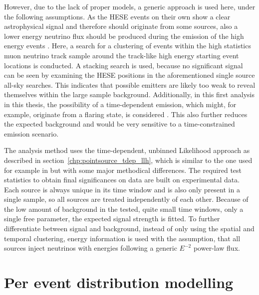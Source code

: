 However, due to the lack of proper models, a generic approach is used here, under the following assumptions.
As the HESE events on their own show a clear astrophysical signal and therefore should originate from some sources, also a lower energy neutrino flux should be produced during the emission of the high energy events \cite{MESZAROS2014241,Murase:2014tsa}.
Here, a search for a clustering of events within the high statistics muon neutrino track sample around the track-like high energy starting event locations is conducted.
A stacking search is used, because no significant signal can be seen by examining the HESE positions in the aforementioned single source all-sky searches.
This indicates that possible emitters are likely too weak to reveal themselves within the large sample background.
Additionally, in this first analysis in this thesis, the possibility of a time-dependent emission, which might, for example, originate from a flaring state, is considered \cite{Mundell:2011radio,Goosmann:2004hw,Eichmann:2012blazars}.
This also further reduces the expected background and would be very sensitive to a time-constrained emission scenario.

The analysis method uses the time-dependent, unbinned Likelihood approach as described in section~\ref{chp:pointsource_tdep_llh}, which is similar to the one used for example in \cite{Aartsen:2017zvw} but with some major methodical differences.
The required test statistics to obtain final significances on data are built on experimental data.
Each source is always unique in its time window and is also only present in a single sample, so all sources are treated independently of each other.
Because of the low amount of background in the tested, quite small time windows, only a single free parameter, the expected signal strength is fitted.
To further differentiate between signal and background, instead of only using the spatial and temporal clustering, energy information is used with the assumption, that all sources inject neutrinos with energies following a generic $E^{-2}$ power-law flux.


\section{Per event distribution modelling}
  \label{chp:tdep_pdfs}
